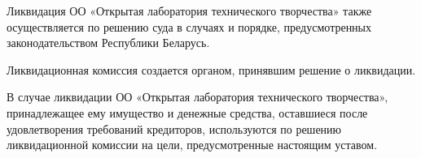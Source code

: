 \documentclass[a4paper,14pt,titlepage]{extarticle}
\begin{document}
Ликвидация ОО «Открытая лаборатория технического творчества» также осуществляется по решению суда в случаях и порядке,
предусмотренных законодательством Республики Беларусь.

Ликвидационная комиссия создается органом, принявшим решение о ликвидации.

В случае ликвидации ОО «Открытая лаборатория технического творчества», принадлежащее ему имущество и денежные средства,
оставшиеся после удовлетворения требований кредиторов, используются по решению ликвидационной комиссии на цели,
предусмотренные настоящим уставом.
\end{document}
